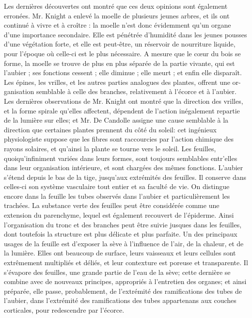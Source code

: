 Les dernières découvertes ont montré que ces deux opinions sont également erronées. Mr. Knight a enlevé la moelle de plusieurs jeunes arbres, et ils ont continué à vivre et à croître : la moelle n'est donc évidemment qu'un organe d'une importance secondaire. Elle est pénétrée d'humidité dans les jeunes pousses d'une végétation forte, et elle est peut-être, un réservoir de nourriture liquide, pour l'époque où celle-ci est le plus nécessaire. A mesure que le cœur du bois se forme, la moelle se trouve de plus en plus séparée de la partie vivante, qui est l'aubier ; ses fonctions cessent ; elle diminue ; elle meurt ; et enfin elle disparaît.
Les épines, les vrilles, et les autres parties analogues des plantes, offrent une or-\setcounter{page}{382} ganisation semblable à celle des branches, relativement à l'écorce et à l'aubier. Les dernières observations de Mr. Knight ont montré que la direction des vrilles, et la forme spirale qu'elles affectent, dépendent de l'action inégalement repartie de la lumière sur elles; et Mr. De Candolle assigne une cause semblable à la direction que certaines plantes prennent du côté du soleil: cet ingénieux physiologiste suppose que les fibres sont raccourcies par l'action chimique des rayons solaires, et qu'ainsi la plante se tourne vers le soleil.
Les feuilles, quoiqu'infiniment variées dans leurs formes, sont toujours semblables entr'elles dans leur organisation intérieure, et sont chargées des mêmes fonctions.
L'aubier s'étend depuis le bas de la tige, jusqu'aux extrémités des feuilles. Il conserve dans celles-ci son système vasculaire tout entier et sa faculté de vie. On distingue encore dans la feuille les tubes observés dans l'aubier et particulièrement les trachées.
La substance verte des feuilles peut être considérée comme une extension du parenchyme, lequel est également recouvert de l'épiderme. Ainsi l'organisation du tronc et des branches peut être suivie jusques dans les feuilles, dont toutefois la structure est plus délicate et plus parfaite.\setcounter{page}{383} Un des principaux usages de la feuille est d’exposer la sève à l’influence de l’air, de la chaleur, et de la lumière. Elles ont beaucoup de surface, leurs vaisseaux et leurs cellules sont extrêmement multipliés et déliés, et leur contexture est poreuse et transparente. Il s’évapore des feuilles, une grande partie de l’eau de la sève; cette dernière se combine avec de nouveaux principes, appropriés à l’entretien des organes; et ainsi préparée, elle passe, probablement, de l’extrémité des ramifications des tubes de l’aubier, dans l’extrémité des ramifications des tubes appartenans aux couches corticales, pour redescendre par l’écorce.
